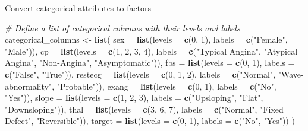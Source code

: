 \documentclass[
]{article}
\newenvironment{Shaded}{\begin{snugshade}}{\end{snugshade}}
\newcommand{\AttributeTok}[1]{\textcolor[rgb]{0.13,0.29,0.53}{#1}}
\newcommand{\CommentTok}[1]{\textcolor[rgb]{0.56,0.35,0.01}{\textit{#1}}}
\newcommand{\DecValTok}[1]{\textcolor[rgb]{0.00,0.00,0.81}{#1}}
\newcommand{\FunctionTok}[1]{\textcolor[rgb]{0.13,0.29,0.53}{\textbf{#1}}}
\newcommand{\NormalTok}[1]{#1}
\newcommand{\OtherTok}[1]{\textcolor[rgb]{0.56,0.35,0.01}{#1}}
\newcommand{\StringTok}[1]{\textcolor[rgb]{0.31,0.60,0.02}{#1}}
\begin{document}
Convert categorical attributes to factors

\begin{Shaded}
\begin{Highlighting}[]
\CommentTok{\# Define a list of categorical columns with their levels and labels}
\NormalTok{categorical\_columns }\OtherTok{\textless{}{-}} \FunctionTok{list}\NormalTok{(}
  \AttributeTok{sex =} \FunctionTok{list}\NormalTok{(}\AttributeTok{levels =} \FunctionTok{c}\NormalTok{(}\DecValTok{0}\NormalTok{, }\DecValTok{1}\NormalTok{), }\AttributeTok{labels =} \FunctionTok{c}\NormalTok{(}\StringTok{"Female"}\NormalTok{, }\StringTok{"Male"}\NormalTok{)),}
  \AttributeTok{cp =} \FunctionTok{list}\NormalTok{(}\AttributeTok{levels =} \FunctionTok{c}\NormalTok{(}\DecValTok{1}\NormalTok{, }\DecValTok{2}\NormalTok{, }\DecValTok{3}\NormalTok{, }\DecValTok{4}\NormalTok{), }\AttributeTok{labels =} \FunctionTok{c}\NormalTok{(}\StringTok{"Typical Angina"}\NormalTok{, }\StringTok{"Atypical Angina"}\NormalTok{, }\StringTok{"Non{-}Angina"}\NormalTok{, }\StringTok{"Asymptomatic"}\NormalTok{)),}
  \AttributeTok{fbs =} \FunctionTok{list}\NormalTok{(}\AttributeTok{levels =} \FunctionTok{c}\NormalTok{(}\DecValTok{0}\NormalTok{, }\DecValTok{1}\NormalTok{), }\AttributeTok{labels =} \FunctionTok{c}\NormalTok{(}\StringTok{"False"}\NormalTok{, }\StringTok{"True"}\NormalTok{)),}
  \AttributeTok{restecg =} \FunctionTok{list}\NormalTok{(}\AttributeTok{levels =} \FunctionTok{c}\NormalTok{(}\DecValTok{0}\NormalTok{, }\DecValTok{1}\NormalTok{, }\DecValTok{2}\NormalTok{), }\AttributeTok{labels =} \FunctionTok{c}\NormalTok{(}\StringTok{"Normal"}\NormalTok{, }\StringTok{"Wave{-}abnormality"}\NormalTok{, }\StringTok{"Probable"}\NormalTok{)),}
  \AttributeTok{exang =} \FunctionTok{list}\NormalTok{(}\AttributeTok{levels =} \FunctionTok{c}\NormalTok{(}\DecValTok{0}\NormalTok{, }\DecValTok{1}\NormalTok{), }\AttributeTok{labels =} \FunctionTok{c}\NormalTok{(}\StringTok{"No"}\NormalTok{, }\StringTok{"Yes"}\NormalTok{)),}
  \AttributeTok{slope =} \FunctionTok{list}\NormalTok{(}\AttributeTok{levels =} \FunctionTok{c}\NormalTok{(}\DecValTok{1}\NormalTok{, }\DecValTok{2}\NormalTok{, }\DecValTok{3}\NormalTok{), }\AttributeTok{labels =} \FunctionTok{c}\NormalTok{(}\StringTok{"Upsloping"}\NormalTok{, }\StringTok{"Flat"}\NormalTok{, }\StringTok{"Downsloping"}\NormalTok{)),}
  \AttributeTok{thal =} \FunctionTok{list}\NormalTok{(}\AttributeTok{levels =} \FunctionTok{c}\NormalTok{(}\DecValTok{3}\NormalTok{, }\DecValTok{6}\NormalTok{, }\DecValTok{7}\NormalTok{), }\AttributeTok{labels =} \FunctionTok{c}\NormalTok{(}\StringTok{"Normal"}\NormalTok{, }\StringTok{"Fixed Defect"}\NormalTok{, }\StringTok{"Reversible"}\NormalTok{)),}
  \AttributeTok{target =} \FunctionTok{list}\NormalTok{(}\AttributeTok{levels =} \FunctionTok{c}\NormalTok{(}\DecValTok{0}\NormalTok{, }\DecValTok{1}\NormalTok{), }\AttributeTok{labels =} \FunctionTok{c}\NormalTok{(}\StringTok{"No"}\NormalTok{, }\StringTok{"Yes"}\NormalTok{))}
\NormalTok{)}


\end{Highlighting}
\end{Shaded}
\end{document}
